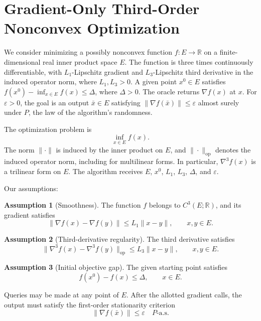 \documentclass[10pt]{article}
\theoremstyle{definition}
\newtheorem{assumption}{Assumption}
\begin{document}
\section*{Gradient-Only Third-Order Nonconvex Optimization}
We consider minimizing a possibly nonconvex function $f:E\to\mathbb{R}$ on a finite-dimensional real inner product space $E$. The function is three times continuously differentiable, with $L_1$-Lipschitz gradient and $L_3$-Lipschitz third derivative in the induced operator norm, where $L_1,L_3>0$. A given point $x^0\in E$ satisfies $f(x^0)-\inf_{x\in E}f(x)\leq\Delta$, where $\Delta>0$. The oracle returns $\nabla f(x)$ at $x$. For $\varepsilon>0$, the goal is an output $\bar{x}\in E$ satisfying $\|\nabla f(\bar{x})\|\leq\varepsilon$ almost surely under $P$, the law of the algorithm's randomness.

The optimization problem is
\[
\inf_{x\in E} f(x).
\]
The norm $\|\cdot\|$ is induced by the inner product on $E$, and $\|\cdot\|_{\mathrm{op}}$ denotes the induced operator norm, including for multilinear forms. In particular, $\nabla^3 f(x)$ is a trilinear form on $E$. The algorithm receives $E$, $x^0$, $L_1$, $L_3$, $\Delta$, and $\varepsilon$.

Our assumptions:
\begin{assumption}[Smoothness]
The function $f$ belongs to $C^3(E;\mathbb{R})$, and its gradient satisfies
\[
\|\nabla f(x)-\nabla f(y)\|\leq L_1\|x-y\|,
\qquad x,y\in E.
\]
\end{assumption}

\begin{assumption}[Third-derivative regularity]
The third derivative satisfies
\[
\|\nabla^3 f(x)-\nabla^3 f(y)\|_{\mathrm{op}}
\leq L_3\|x-y\|,
\qquad x,y\in E.
\]
\end{assumption}

\begin{assumption}[Initial objective gap]
The given starting point satisfies
\[
f(x^0)-f(x)\leq\Delta,
\qquad x\in E.
\]
\end{assumption}

Queries may be made at any point of $E$. After the allotted gradient calls, the output must satisfy the first-order stationarity criterion
\[
\|\nabla f(\bar{x})\|\leq\varepsilon
\quad P\text{-a.s.}
\]
\end{document}
